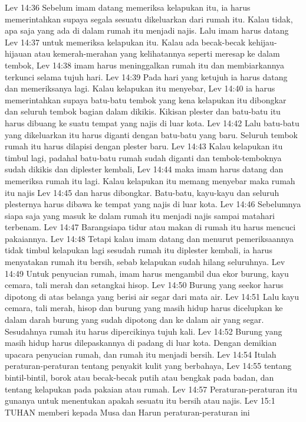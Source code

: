 Lev 14:36  Sebelum imam datang memeriksa kelapukan itu, ia harus memerintahkan supaya segala sesuatu dikeluarkan dari rumah itu. Kalau tidak, apa saja yang ada di dalam rumah itu menjadi najis. Lalu imam harus datang
Lev 14:37  untuk memeriksa kelapukan itu. Kalau ada becak-becak kehijau-hijauan atau kemerah-merahan yang kelihatannya seperti meresap ke dalam tembok,
Lev 14:38  imam harus meninggalkan rumah itu dan membiarkannya terkunci selama tujuh hari.
Lev 14:39  Pada hari yang ketujuh ia harus datang dan memeriksanya lagi. Kalau kelapukan itu menyebar,
Lev 14:40  ia harus memerintahkan supaya batu-batu tembok yang kena kelapukan itu dibongkar dan seluruh tembok bagian dalam dikikis. Kikisan plester dan batu-batu itu harus dibuang ke suatu tempat yang najis di luar kota.
Lev 14:42  Lalu batu-batu yang dikeluarkan itu harus diganti dengan batu-batu yang baru. Seluruh tembok rumah itu harus dilapisi dengan plester baru.
Lev 14:43  Kalau kelapukan itu timbul lagi, padahal batu-batu rumah sudah diganti dan tembok-temboknya sudah dikikis dan diplester kembali,
Lev 14:44  maka imam harus datang dan memeriksa rumah itu lagi. Kalau kelapukan itu memang menyebar maka rumah itu najis
Lev 14:45  dan harus dibongkar. Batu-batu, kayu-kayu dan seluruh plesternya harus dibawa ke tempat yang najis di luar kota.
Lev 14:46  Sebelumnya siapa saja yang masuk ke dalam rumah itu menjadi najis sampai matahari terbenam.
Lev 14:47  Barangsiapa tidur atau makan di rumah itu harus mencuci pakaiannya.
Lev 14:48  Tetapi kalau imam datang dan menurut pemeriksaannya tidak timbul kelapukan lagi sesudah rumah itu diplester kembali, ia harus menyatakan rumah itu bersih, sebab kelapukan sudah hilang seluruhnya.
Lev 14:49  Untuk penyucian rumah, imam harus mengambil dua ekor burung, kayu cemara, tali merah dan setangkai hisop.
Lev 14:50  Burung yang seekor harus dipotong di atas belanga yang berisi air segar dari mata air.
Lev 14:51  Lalu kayu cemara, tali merah, hisop dan burung yang masih hidup harus dicelupkan ke dalam darah burung yang sudah dipotong dan ke dalam air yang segar. Sesudahnya rumah itu harus dipercikinya tujuh kali.
Lev 14:52  Burung yang masih hidup harus dilepaskannya di padang di luar kota. Dengan demikian upacara penyucian rumah, dan rumah itu menjadi bersih.
Lev 14:54  Itulah peraturan-peraturan tentang penyakit kulit yang berbahaya,
Lev 14:55  tentang bintil-bintil, borok atau becak-becak putih atau bengkak pada badan, dan tentang kelapukan pada pakaian atau rumah.
Lev 14:57  Peraturan-peraturan itu gunanya untuk menentukan apakah sesuatu itu bersih atau najis.
Lev 15:1  TUHAN memberi kepada Musa dan Harun peraturan-peraturan ini
